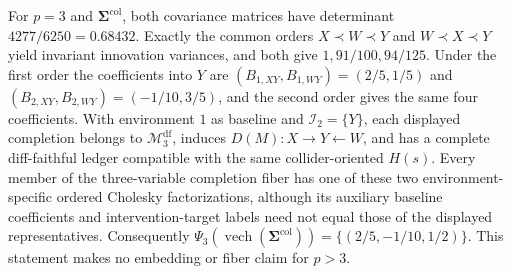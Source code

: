 For \(p=3\) and \(\boldsymbol\Sigma^{\mathrm{col}}\), both covariance matrices have determinant \(4277/6250=0.68432\). Exactly the common orders \(X\prec W\prec Y\) and \(W\prec X\prec Y\) yield invariant innovation variances, and both give \(1,91/100,94/125\). Under the first order the coefficients into \(Y\) are \((B_{1,XY},B_{1,WY})=(2/5,1/5)\) and \((B_{2,XY},B_{2,WY})=(-1/10,3/5)\), and the second order gives the same four coefficients. With environment \(1\) as baseline and \(\mathcal I_2=\{Y\}\), each displayed completion belongs to \(\mathcal M_3^{\mathrm{df}}\), induces \(D(M):X\to Y\leftarrow W\), and has a complete diff-faithful ledger compatible with the same collider-oriented \(H(s)\). Every member of the three-variable completion fiber has one of these two environment-specific ordered Cholesky factorizations, although its auxiliary baseline coefficients and intervention-target labels need not equal those of the displayed representatives. Consequently \(\Psi_3(\operatorname{vech}(\boldsymbol\Sigma^{\mathrm{col}}))=\{(2/5,-1/10,1/2)\}\). This statement makes no embedding or fiber claim for \(p>3\).